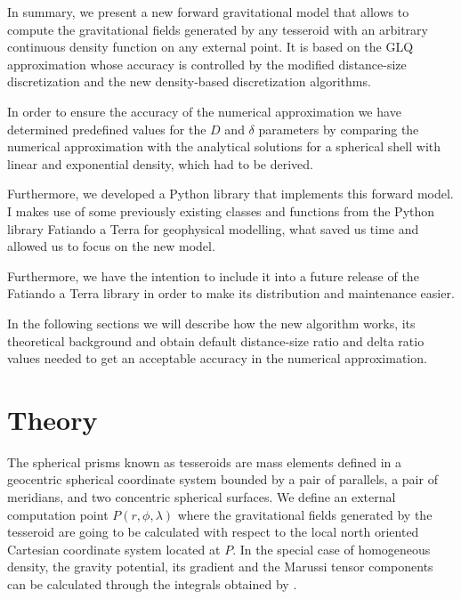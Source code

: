 \documentclass[extra]{gji}
\begin{document}
In summary, we present a new forward gravitational model that allows to 
compute the gravitational fields generated by any tesseroid with an 
arbitrary continuous density function on any external point.
It is based on the GLQ approximation whose accuracy is controlled by 
the modified distance-size discretization \citep{Uieda2016} 
and the new density-based discretization algorithms.

In order to ensure the accuracy of the numerical approximation we have 
determined predefined values for the $D$ and $\delta$ parameters by 
comparing the numerical approximation with the analytical solutions for 
a spherical shell with linear and exponential density, which had to be 
derived.

Furthermore, we developed a Python library that implements this forward 
model.
I makes use of some previously existing classes and functions 
from the Python library Fatiando a Terra for geophysical modelling, 
what saved us time and allowed us to focus on the new model.

Furthermore, we have the intention to include it into a future release 
of the Fatiando a Terra library in order to make its distribution and 
maintenance easier.

In the following sections we will describe how the new algorithm works, its 
theoretical background and obtain default distance-size ratio and delta ratio 
values needed to get an acceptable accuracy in the numerical approximation.


\section{Theory}

The spherical prisms known as tesseroids are mass elements defined in a 
geocentric spherical coordinate system bounded by a pair of parallels, 
a pair of  meridians, and two concentric spherical surfaces.
We define an external computation point $P(r, \phi, \lambda)$ where the 
gravitational fields generated by the tesseroid are going to be calculated 
with respect to the local north oriented Cartesian coordinate system 
located at $P$.
In the special case of homogeneous density, the gravity potential, its 
gradient and the Marussi tensor components can be calculated through 
the integrals obtained by \citet{Grombein2013} \citep[for same notation 
as the one we will use, see][]{Uieda2016}.
\end{document}
